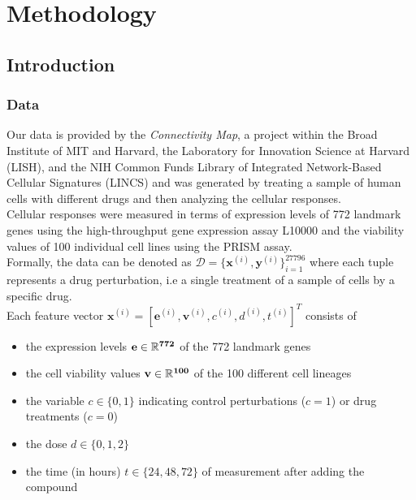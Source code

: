 \documentclass[bsc,frontabs,twoside,singlespacing,parskip,deptreport]{infthesis}     %
\let\Oldsection\section
\renewcommand{\section}{\FloatBarrier\Oldsection}
\let\Oldsubsection\subsection
\renewcommand{\subsection}{\FloatBarrier\Oldsubsection}
\begin{document}


\chapter{Methodology}\label{methodology}
\section{Introduction}
\subsection{Data}
Our data is provided by the \textit{Connectivity Map}, a project within the Broad Institute of MIT and Harvard, the Laboratory for Innovation Science at Harvard (LISH), and the NIH Common Funds Library of Integrated Network-Based Cellular Signatures (LINCS) and was generated by treating a sample of human cells with different drugs and then analyzing the cellular responses. \\ Cellular responses were measured in terms of expression levels of 772 landmark genes using the high-throughput gene expression assay L10000 and the viability values of 100 individual cell lines using the PRISM assay.\\
Formally, the data can be denoted as \(\mathscr{D}=\{\mathbf{x}^{(i)},\mathbf{y}^{(i)}\}_{i=1}^{27796}\) where each tuple represents a drug perturbation, i.e a single treatment of a sample of cells by a specific drug.
\\ Each feature vector \(\mathbf{x}^{(i)}=[\mathbf{e}^{(i)},\mathbf{v}^{(i)}, c^{(i)},d^{(i)},t^{(i)}]^{T}\) consists of 
\begin{itemize}
    \item the expression levels \(\bf{e} \in \mathbb{R}^{772}\) of the 772 landmark genes
    \item the cell viability values \(\bf{v} \in \mathbb{R}^{100}\) of the 100 different cell lineages
    \item the variable \(c \in \{0,1\}\) indicating control perturbations (\(c=1\)) or drug treatments (\(c=0\))
    \item the dose \(d \in \{0,1,2\}\)
    \item the time (in hours) \(t \in \{24,48,72\}\) of measurement after adding the compound
    
\end{itemize}
\end{document}
